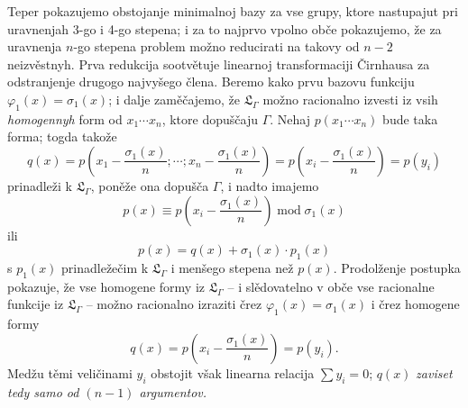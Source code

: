 \documentclass[11pt]{article}
\begin{document}
Teper pokazujemo obstojanje minimalnoj bazy za vse grupy, ktore nastupajut pri uravnenjah 3-go i 4-go stepena; i za to najprvo vpolno obče pokazujemo, že za uravnenja $n$-go stepena problem možno reducirati na takovy od $n-2$ neizvěstnyh. Prva redukcija sootvětuje linearnoj transformaciji Čirnhausa za odstranjenje drugogo najvyšego člena. Beremo kako prvu bazovu funkciju $\varphi_1(x)=\sigma_1(x)$; i dalje zaměčajemo, že $\mathfrak L_\Gamma$ možno racionalno izvesti iz vsih {\itshape homogennyh} form od $x_1\cdots x_n$, ktore dopuščaju $\Gamma$. Nehaj $p(x_1\cdots x_n)$ bude taka forma; togda takože
\[
q(x)=p\left(x_1-\frac{\sigma_1(x)}{n};\cdots;x_n-\frac{\sigma_1(x)}{n}\right)=p\left(x_i-\frac{\sigma_1(x)}{n}\right)=p(y_i)
\]
prinadleži k $\mathfrak L_\Gamma$, poněže ona dopušča $\Gamma$, i nadto imajemo
\[
p(x)\equiv p\left(x_i-\frac{\sigma_1(x)}{n}\right)\operatorname{mod}\sigma_1(x)
\]
ili
\[
p(x)=q(x)+\sigma_1(x)\cdot p_1(x)
\]
s $p_1(x)$ prinadležečim k $\mathfrak L_\Gamma$ i menšego stepena než $p(x)$. Prodolženje postupka pokazuje, že vse homogene formy iz $\mathfrak L_\Gamma$ -- i slědovatelno v obče vse racionalne funkcije iz $\mathfrak L_\Gamma$ -- možno racionalno izraziti črez $\varphi_1(x)=\sigma_1(x)$ i črez homogene formy
\[
q(x)=p\left(x_i-\frac{\sigma_1(x)}{n}\right)=p(y_i).
\]
Medžu těmi veličinami $y_i$ obstojit však linearna relacija $\sum y_i=0$; $q(x)$ {\itshape zaviset tedy samo od $(n-1)$ argumentov.}
\end{document}

